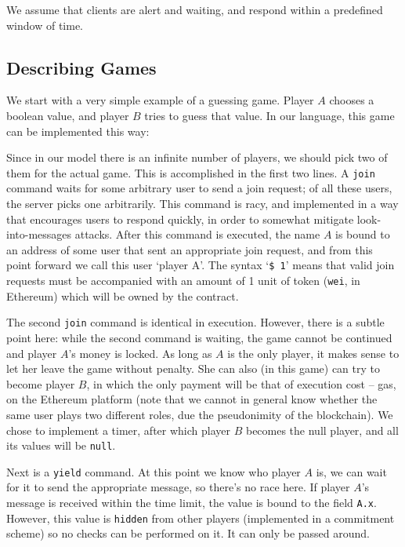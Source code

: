 \documentclass[acmsmall,review,anonymous]{acmart}\settopmatter{printfolios=true,printccs=false,printacmref=false}
\begin{document}
We assume that clients are alert and waiting, and respond within a predefined window of time.


\subsection{Describing Games}
We start with a very simple example of a guessing game. Player $A$ chooses a boolean value, and player $B$ tries to guess that value.
In our language, this game can be implemented this way:



Since in our model there is an infinite number of players, we should pick two of them for the actual game. This is accomplished in the first two lines. A \texttt{join} command waits for some arbitrary user to send a join request; of all these users, the server picks one arbitrarily. This command is racy, and implemented in a way that encourages users to respond quickly, in order to somewhat mitigate look-into-messages attacks. After this command is executed, the name $A$ is bound to an address of some user that sent an appropriate join request, and from this point forward we call this user `player A'. The syntax `\texttt{\$ 1}' means that valid join requests must be accompanied with an amount of 1 unit of token (\texttt{wei}, in Ethereum) which will be owned by the contract.

The second \texttt{join} command is identical in execution. However, there is a subtle point here: while the second command is waiting, the game cannot be continued and player $A$'s money is locked. As long as $A$ is the only player, it makes sense to let her leave the game without penalty. She can also (in this game) can try to become player $B$, in which the only payment will be that of execution cost -- gas, on the Ethereum platform (note that we cannot in general know whether the same user plays two different roles, due the pseudonimity of the blockchain). We chose to implement a timer, after which player $B$ becomes the null player, and all its values will be \texttt{null}.

Next is a \texttt{yield} command. At this point we know who player $A$ is, we can wait for it to send the appropriate message, so there's no race here. If player $A$'s message is received within the time limit, the value is bound to the field \texttt{A.x}. However, this value is \texttt{hidden} from other players (implemented in a commitment scheme) so no checks can be performed on it. It can only be passed around.
\end{document}
